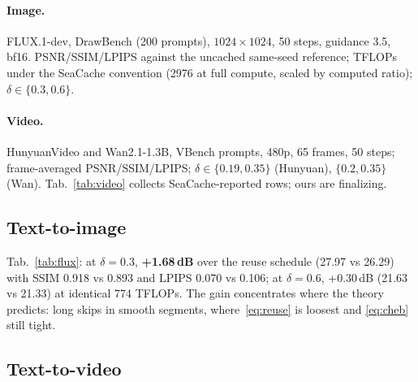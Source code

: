 \documentclass[10pt,twocolumn,letterpaper]{article}
\begin{document}
\paragraph{Image.} FLUX.1-dev, DrawBench (200 prompts), $1024{\times}1024$,
50 steps, guidance 3.5, bf16. PSNR/SSIM/LPIPS against the uncached
same-seed reference; TFLOPs under the SeaCache convention (2976 at full
compute, scaled by computed ratio); $\delta \in \{0.3, 0.6\}$.

\paragraph{Video.} HunyuanVideo and Wan2.1-1.3B, VBench prompts, 480p,
65 frames, 50 steps; frame-averaged PSNR/SSIM/LPIPS; $\delta \in
\{0.19, 0.35\}$ (Hunyuan), $\{0.2, 0.35\}$ (Wan). Tab.~\ref{tab:video}
collects SeaCache-reported rows; ours are finalizing.

\subsection{Text-to-image}
\label{sec:t2i}

Tab.~\ref{tab:flux}: at $\delta{=}0.3$, \textbf{+1.68\,dB} over the
reuse schedule (27.97 vs 26.29) with SSIM 0.918 vs 0.893 and LPIPS
0.070 vs 0.106; at $\delta{=}0.6$, +0.30\,dB (21.63 vs 21.33) at
identical 774 TFLOPs. The gain concentrates where the theory predicts:
long skips in smooth segments, where~\eqref{eq:reuse} is loosest and
\eqref{eq:cheb} still tight.

\subsection{Text-to-video}
\label{sec:t2v}
\end{document}
